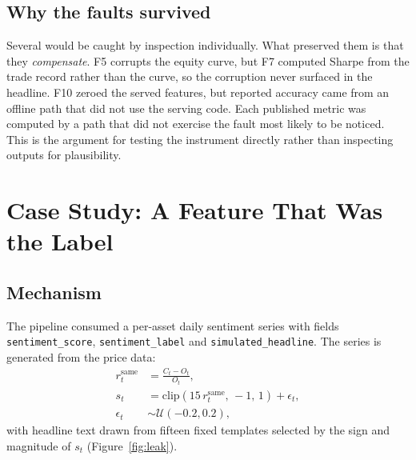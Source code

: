 \documentclass[preprint,12pt,authoryear]{elsarticle}
\begin{document}
\subsection{Why the faults survived}

Several would be caught by inspection individually. What preserved them is that
they \emph{compensate}. F5 corrupts the equity curve, but F7 computed Sharpe from
the trade record rather than the curve, so the corruption never surfaced in the
headline. F10 zeroed the served features, but reported accuracy came from an
offline path that did not use the serving code. Each published metric was
computed by a path that did not exercise the fault most likely to be noticed.
This is the argument for testing the instrument directly rather than inspecting
outputs for plausibility.

\section{Case Study: A Feature That Was the Label}
\label{sec:leakage}

\subsection{Mechanism}

The pipeline consumed a per-asset daily sentiment series with fields
\texttt{sentiment\_score}, \texttt{sentiment\_label} and
\texttt{simulated\_headline}. The series is generated from the price data:
\begin{align}
r^{\text{same}}_t &= \frac{C_t - O_t}{O_t}, \\
s_t &= \mathrm{clip}\!\left(15\, r^{\text{same}}_t,\, -1,\, 1\right) + \epsilon_t, \\
\epsilon_t &\sim \mathcal{U}(-0.2, 0.2),
\label{eq:sentgen}
\end{align}
with headline text drawn from fifteen fixed templates selected by the sign and
magnitude of $s_t$ (Figure~\ref{fig:leak}).
\end{document}
